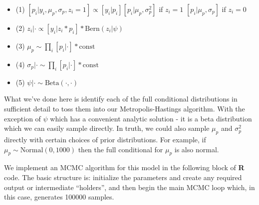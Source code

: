 \begin{itemize}
\item (1) $[p_{i}|y_{i}, \mu_p, \sigma_{p},z_{i}=1] \propto 
[y_{i}|p_{i}][p_{i}|\mu_p,\sigma_{p}^{2}]$ if $z_{i}=1$ 
 $[p_{i}|\mu_p,\sigma_{p}]$ if $z_{i}=0$
\item (2)  $z_{i} | \cdot \propto [y_{i}|z_{i}*p_{i}]*\mbox{Bern}(z_{i}|\psi)$
\item (3) $\mu_{p} \sim \prod_{i} [p_{i}| \cdot] *\mbox{const}$
\item (4) $\sigma_{p}|\cdot \sim\prod_{i}[p_{i}| \cdot ]*\mbox{const}$
\item (5) $\psi|\cdot\sim \mbox{Beta}(\cdot, \cdot)$
\end{itemize}

What we've done here is identify each of the full conditional
distributions in sufficient detail to toss them into our
Metropolis-Hastings algorithm. With the exception of $\psi$ which has
a convenient analytic solution - it is a beta distribution which we
can easily sample directly. In truth, we could also sample $\mu_{p}$
and $\sigma_{p}^{2}$ directly with certain choices of prior
distributions. For example, if $\mu_{p} \sim \mbox{Normal}(0, 1000)$
then the full conditional for $\mu_{p}$ is also normal.

We implement an MCMC algorithm for this model in the following block
of {\bf R} code.  The basic structure is: initialize the parameters
and create any required output or intermediate ``holders'', and then
begin the main MCMC loop which, in this case, generates 100000
samples.

